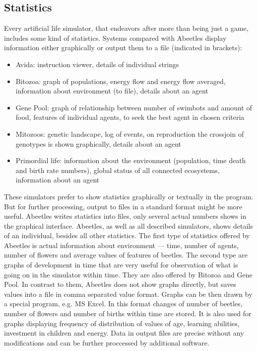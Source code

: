 \documentclass[a4paper,12pt]{report}
\begin{document}
 
\subsection {Statistics}

Every artificial life simulator, that endeavors after more than being just a game, includes some kind of statistics. 
Systems compared with Abeetles display information either graphically or output them to a file (indicated in brackets):

\begin{itemize}
\item Avida: instruction viewer, details of individual strings 
\item Bitozoa: graph of populations, energy flow and energy flow averaged, information about environment (to file), details about an agent
 \item Gene Pool: graph of relationship between number of swimbots and amount of food, features of individual agents, to seek the best agent in chosen criteria
\item Mitozoos: genetic landscape, log of events, on reproduction the crossjoin of genotypes is shown graphically, details about an agent
\item Primordial life: information about the environment (population, time death and birth rate numbers), global status of all connected ecosystems, information about an agent
\end {itemize}


These simulators prefer to show statistics graphically or textually in the program. But for further processing, output to files in a standard format might be more useful. Abeetles writes statistics into files, only several actual numbers shows in the graphical interface. Abeetles, as well as all described simulators, shows details of an individual, besides all other statistics. The first type of statistics offered by Abeetles is actual information about environment --- time, number of agents, number of flowers and average values of features of beetles. The second type are graphs of development in time that are very useful for observation of what is going on in the simulator within time. They are also offered by Bitozoa and Gene Pool. In contrast to them, Abeetles does not show graphs directly, but saves values into a file in comma separated value format. Graphs can be then drawn by a special program, e.g. MS Excel. In this format changes of number of beetles, number of flowers and number of births within time are stored. It is also used for graphs displaying frequency of distribution of values of age, learning abilities, investment in children and energy. Data in output files are precise without any modifications and can be  further proccessed by additional software.
\end{document}
